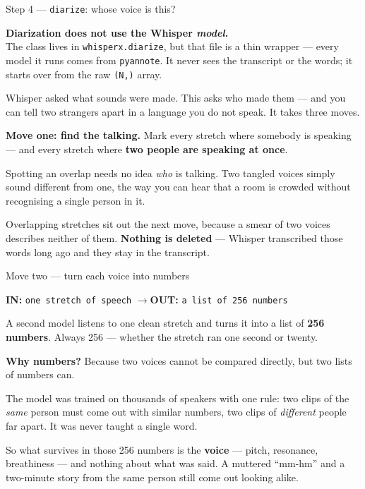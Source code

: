 \documentclass[aspectratio=169]{beamer}
\newcommand{\shapebox}[2]{%
  \begin{center}
  \colorbox{black!8}{\parbox{0.9\textwidth}{\centering
  \textbf{IN:} \texttt{#1} \qquad$\longrightarrow$\qquad \textbf{OUT:} \texttt{#2}}}
  \end{center}}
\begin{document}
\begin{frame}{Step 4 --- \texttt{diarize}: whose voice is this?}

\begin{center}
\colorbox{red!12}{\parbox{0.92\textwidth}{\centering
\textbf{Diarization does not use the Whisper \emph{model}.} \\[0.3em]
\footnotesize The class lives in \texttt{whisperx.diarize}, but that file is a thin wrapper
--- every model it runs comes from \texttt{pyannote}. It never sees the transcript or the
words; it starts over from the raw \texttt{(N,)} array.}}
\end{center}

\vspace{0.3em}
Whisper asked what sounds were made. This asks who made them --- and you can tell two
strangers apart in a language you do not speak. It takes three moves.

\vspace{0.8em}
\textbf{Move one: find the talking.} Mark every stretch where somebody is speaking --- and
every stretch where \textbf{two people are speaking at once}.

\vspace{0.5em}
Spotting an overlap needs no idea \emph{who} is talking. Two tangled voices simply sound
different from one, the way you can hear that a room is crowded without recognising a single
person in it.

\vspace{0.5em}
Overlapping stretches sit out the next move, because a smear of two voices describes neither
of them. \textbf{Nothing is deleted} --- Whisper transcribed those words long ago and they
stay in the transcript.

\end{frame}

\begin{frame}{Move two --- turn each voice into numbers}

\shapebox{one stretch of speech}{a list of 256 numbers}

A second model listens to one clean stretch and turns it into a list of \textbf{256
numbers}. Always 256 --- whether the stretch ran one second or twenty.

\vspace{0.6em}
\textbf{Why numbers?} Because two voices cannot be compared directly, but two lists of
numbers can.

\vspace{0.6em}
The model was trained on thousands of speakers with one rule: two clips of the \emph{same}
person must come out with similar numbers, two clips of \emph{different} people far apart.
It was never taught a single word.

\vspace{0.6em}
So what survives in those 256 numbers is the \textbf{voice} --- pitch, resonance,
breathiness --- and nothing about what was said. A muttered ``mm-hm'' and a two-minute story
from the same person still come out looking alike.

\end{frame}
\end{document}
